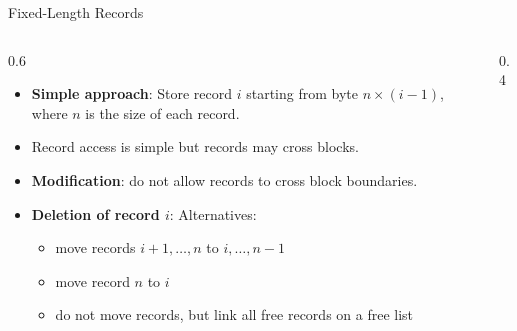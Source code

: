\documentclass[aspectratio=169, xcolor=dvipsnames]{beamer}
\begin{document}
\begin{frame}{Fixed-Length Records}
    \begin{columns}
        \begin{column}{0.6\textwidth}
            \begin{block}{}
                \begin{itemize}[<+->]
                    \item \textbf{Simple approach}: Store record $i$ starting from byte $n \times (i - 1)$, where $n$ is the size of each record.
                    \item Record access is simple but records may cross blocks.
                    \item \textbf{Modification}: do not allow records to cross block boundaries.
                    \item \textbf{Deletion of record $i$}: Alternatives:
                    \begin{itemize}[<+->]
                        \item move records $i + 1, \dots, n$ to $i, \dots, n - 1$
                        \item move record $n$ to $i$
                        \item do not move records, but link all free records on a free list
                    \end{itemize}
                \end{itemize}
            \end{block}
        \end{column}
        \begin{column}{0.4\textwidth}
            \begin{table}[]
                \centering
            \end{table}
        \end{column}
    \end{columns}
\end{frame}
\end{document}

